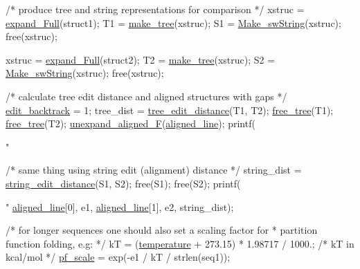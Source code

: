\begin{DoxyCodeInclude}
  \textcolor{comment}{/* produce tree and string representations for comparison */}
  xstruc  = \hyperlink{group__struct__utils__deprecated_ga78d73cd54a068ef2812812771cdddc6f}{expand\_Full}(struct1);
  T1      = \hyperlink{treedist_8h_a08fe4d5afd385dce593b86eaf010c6e3}{make\_tree}(xstruc);
  S1      = \hyperlink{stringdist_8h_a3125991b3a403b3f89230474deb3f22e}{Make\_swString}(xstruc);
  free(xstruc);

  xstruc  = \hyperlink{group__struct__utils__deprecated_ga78d73cd54a068ef2812812771cdddc6f}{expand\_Full}(struct2);
  T2      = \hyperlink{treedist_8h_a08fe4d5afd385dce593b86eaf010c6e3}{make\_tree}(xstruc);
  S2      = \hyperlink{stringdist_8h_a3125991b3a403b3f89230474deb3f22e}{Make\_swString}(xstruc);
  free(xstruc);

  \textcolor{comment}{/* calculate tree edit distance and aligned structures with gaps */}
  \hyperlink{dist__vars_8h_aa03194c513af6b860e7b33e370b82bdb}{edit\_backtrack}  = 1;
  tree\_dist       = \hyperlink{treedist_8h_a3b21f1925f7071f46d93431a835217bb}{tree\_edit\_distance}(T1, T2);
  \hyperlink{treedist_8h_acbc1cb9bce582ea945e4a467c76a57aa}{free\_tree}(T1);
  \hyperlink{treedist_8h_acbc1cb9bce582ea945e4a467c76a57aa}{free\_tree}(T2);
  \hyperlink{group__struct__utils__deprecated_ga1054c4477d53b31d79d4cb132100e87a}{unexpand\_aligned\_F}(\hyperlink{dist__vars_8h_ac1605fe3448ad0a0b809c4fb8f6a854a}{aligned\_line});
  printf(\textcolor{stringliteral}{"%

  \textcolor{comment}{/* same thing using string edit (alignment) distance */}
  string\_dist = \hyperlink{stringdist_8h_a89e3c335ef17780576d7c0e713830db9}{string\_edit\_distance}(S1, S2);
  free(S1);
  free(S2);
  printf(\textcolor{stringliteral}{"%
         \hyperlink{dist__vars_8h_ac1605fe3448ad0a0b809c4fb8f6a854a}{aligned\_line}[0], e1, \hyperlink{dist__vars_8h_ac1605fe3448ad0a0b809c4fb8f6a854a}{aligned\_line}[1], e2, string\_dist);

  \textcolor{comment}{/* for longer sequences one should also set a scaling factor for}
\textcolor{comment}{   * partition function folding, e.g: */}
  kT        = (\hyperlink{group__model__details_gab4b11c8d9c758430960896bc3fe82ead}{temperature} + 273.15) * 1.98717 / 1000.; \textcolor{comment}{/* kT in kcal/mol */}
  \hyperlink{group__model__details_gad3b22044065acc6dee0af68931b52cfd}{pf\_scale}  = exp(-e1 / kT / strlen(seq1));

}}
\end{DoxyCodeInclude}
